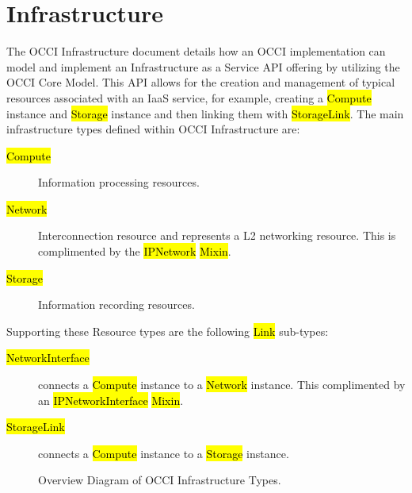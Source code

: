 \documentclass[10pt,a4paper]{article}
\begin{document}

\section{Infrastructure}
The OCCI Infrastructure document details how an OCCI implementation
can model and implement an Infrastructure as a Service API offering by
utilizing the OCCI Core Model. This API allows for the creation and
management of typical resources associated with an IaaS service, for
example, creating a \hl{Compute} instance and \hl{Storage} instance
and then linking them with \hl{StorageLink}. The main infrastructure
types defined within OCCI Infrastructure are:

\begin{description}
\item[\hl{Compute}] Information processing resources.
\item[\hl{Network}] Interconnection resource and represents a L2
  networking resource. This is complimented by the \hl{IPNetwork}
  \hl{Mixin}.
\item[\hl{Storage}] Information recording resources.
\end{description}

Supporting these Resource types are the following \hl{Link} sub-types:

\begin{description}
\item[\hl{NetworkInterface}] connects a \hl{Compute} instance to a
  \hl{Network} instance. This complimented by an
  \hl{IPNetworkInterface} \hl{Mixin}.
\item[\hl{StorageLink}] connects a \hl{Compute} instance to a
  \hl{Storage} instance.
\end{description}

\begin{figure}[!h]
	{\centering {} \par}
	\caption{Overview Diagram of OCCI Infrastructure Types.}
	\label{fig:infra_uml}
\end{figure}
\end{document}
